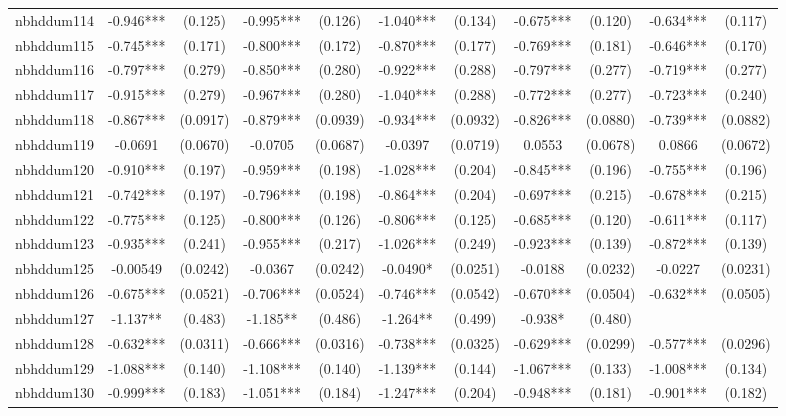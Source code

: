 \documentclass[]{article}
\begin{document}
\begin{tabular}{lcccccccccc}
nbhddum114 & -0.946*** & (0.125) & -0.995*** & (0.126) & -1.040*** & (0.134) & -0.675*** & (0.120) & -0.634*** & (0.117) \\
nbhddum115 & -0.745*** & (0.171) & -0.800*** & (0.172) & -0.870*** & (0.177) & -0.769*** & (0.181) & -0.646*** & (0.170) \\
nbhddum116 & -0.797*** & (0.279) & -0.850*** & (0.280) & -0.922*** & (0.288) & -0.797*** & (0.277) & -0.719*** & (0.277) \\
nbhddum117 & -0.915*** & (0.279) & -0.967*** & (0.280) & -1.040*** & (0.288) & -0.772*** & (0.277) & -0.723*** & (0.240) \\
nbhddum118 & -0.867*** & (0.0917) & -0.879*** & (0.0939) & -0.934*** & (0.0932) & -0.826*** & (0.0880) & -0.739*** & (0.0882) \\
nbhddum119 & -0.0691 & (0.0670) & -0.0705 & (0.0687) & -0.0397 & (0.0719) & 0.0553 & (0.0678) & 0.0866 & (0.0672) \\
nbhddum120 & -0.910*** & (0.197) & -0.959*** & (0.198) & -1.028*** & (0.204) & -0.845*** & (0.196) & -0.755*** & (0.196) \\
nbhddum121 & -0.742*** & (0.197) & -0.796*** & (0.198) & -0.864*** & (0.204) & -0.697*** & (0.215) & -0.678*** & (0.215) \\
nbhddum122 & -0.775*** & (0.125) & -0.800*** & (0.126) & -0.806*** & (0.125) & -0.685*** & (0.120) & -0.611*** & (0.117) \\
nbhddum123 & -0.935*** & (0.241) & -0.955*** & (0.217) & -1.026*** & (0.249) & -0.923*** & (0.139) & -0.872*** & (0.139) \\
nbhddum125 & -0.00549 & (0.0242) & -0.0367 & (0.0242) & -0.0490* & (0.0251) & -0.0188 & (0.0232) & -0.0227 & (0.0231) \\
nbhddum126 & -0.675*** & (0.0521) & -0.706*** & (0.0524) & -0.746*** & (0.0542) & -0.670*** & (0.0504) & -0.632*** & (0.0505) \\
nbhddum127 & -1.137** & (0.483) & -1.185** & (0.486) & -1.264** & (0.499) & -0.938* & (0.480) &  &  \\
nbhddum128 & -0.632*** & (0.0311) & -0.666*** & (0.0316) & -0.738*** & (0.0325) & -0.629*** & (0.0299) & -0.577*** & (0.0296) \\
nbhddum129 & -1.088*** & (0.140) & -1.108*** & (0.140) & -1.139*** & (0.144) & -1.067*** & (0.133) & -1.008*** & (0.134) \\
nbhddum130 & -0.999*** & (0.183) & -1.051*** & (0.184) & -1.247*** & (0.204) & -0.948*** & (0.181) & -0.901*** & (0.182) \\

\end{tabular}
\end{document}
